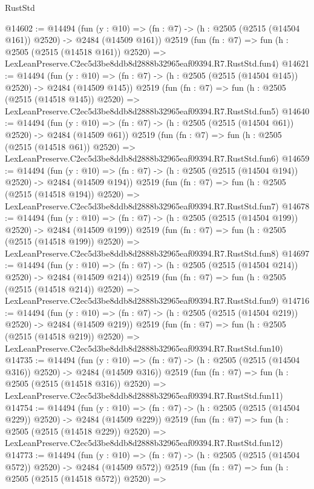 \begin{lexlean}{RustStd}
\begin{coremodule}
@14602 := @14494
    (fun (y : @10) => (fn : @7) -> (h : @2505 (@2515 (@14504 @161)) @2520) -> @2484 (@14509 @161))
    @2519
    (fun (fn : @7) =>
    fun (h : @2505 (@2515 (@14518 @161)) @2520) =>
    LexLeanPreserve.C2ec5d3be8ddb8d2888b32965eaf09394.R7.RustStd.fun4)
@14621 := @14494
    (fun (y : @10) => (fn : @7) -> (h : @2505 (@2515 (@14504 @145)) @2520) -> @2484 (@14509 @145))
    @2519
    (fun (fn : @7) =>
    fun (h : @2505 (@2515 (@14518 @145)) @2520) =>
    LexLeanPreserve.C2ec5d3be8ddb8d2888b32965eaf09394.R7.RustStd.fun5)
@14640 := @14494
    (fun (y : @10) => (fn : @7) -> (h : @2505 (@2515 (@14504 @61)) @2520) -> @2484 (@14509 @61))
    @2519
    (fun (fn : @7) =>
    fun (h : @2505 (@2515 (@14518 @61)) @2520) =>
    LexLeanPreserve.C2ec5d3be8ddb8d2888b32965eaf09394.R7.RustStd.fun6)
@14659 := @14494
    (fun (y : @10) => (fn : @7) -> (h : @2505 (@2515 (@14504 @194)) @2520) -> @2484 (@14509 @194))
    @2519
    (fun (fn : @7) =>
    fun (h : @2505 (@2515 (@14518 @194)) @2520) =>
    LexLeanPreserve.C2ec5d3be8ddb8d2888b32965eaf09394.R7.RustStd.fun7)
@14678 := @14494
    (fun (y : @10) => (fn : @7) -> (h : @2505 (@2515 (@14504 @199)) @2520) -> @2484 (@14509 @199))
    @2519
    (fun (fn : @7) =>
    fun (h : @2505 (@2515 (@14518 @199)) @2520) =>
    LexLeanPreserve.C2ec5d3be8ddb8d2888b32965eaf09394.R7.RustStd.fun8)
@14697 := @14494
    (fun (y : @10) => (fn : @7) -> (h : @2505 (@2515 (@14504 @214)) @2520) -> @2484 (@14509 @214))
    @2519
    (fun (fn : @7) =>
    fun (h : @2505 (@2515 (@14518 @214)) @2520) =>
    LexLeanPreserve.C2ec5d3be8ddb8d2888b32965eaf09394.R7.RustStd.fun9)
@14716 := @14494
    (fun (y : @10) => (fn : @7) -> (h : @2505 (@2515 (@14504 @219)) @2520) -> @2484 (@14509 @219))
    @2519
    (fun (fn : @7) =>
    fun (h : @2505 (@2515 (@14518 @219)) @2520) =>
    LexLeanPreserve.C2ec5d3be8ddb8d2888b32965eaf09394.R7.RustStd.fun10)
@14735 := @14494
    (fun (y : @10) => (fn : @7) -> (h : @2505 (@2515 (@14504 @316)) @2520) -> @2484 (@14509 @316))
    @2519
    (fun (fn : @7) =>
    fun (h : @2505 (@2515 (@14518 @316)) @2520) =>
    LexLeanPreserve.C2ec5d3be8ddb8d2888b32965eaf09394.R7.RustStd.fun11)
@14754 := @14494
    (fun (y : @10) => (fn : @7) -> (h : @2505 (@2515 (@14504 @229)) @2520) -> @2484 (@14509 @229))
    @2519
    (fun (fn : @7) =>
    fun (h : @2505 (@2515 (@14518 @229)) @2520) =>
    LexLeanPreserve.C2ec5d3be8ddb8d2888b32965eaf09394.R7.RustStd.fun12)
@14773 := @14494
    (fun (y : @10) => (fn : @7) -> (h : @2505 (@2515 (@14504 @572)) @2520) -> @2484 (@14509 @572))
    @2519
    (fun (fn : @7) =>
    fun (h : @2505 (@2515 (@14518 @572)) @2520) =>

\end{coremodule}
\end{lexlean}
